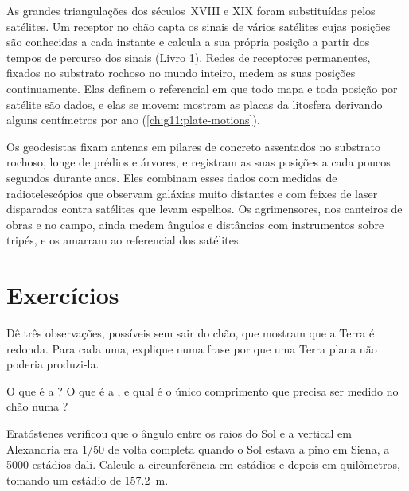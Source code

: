 As grandes triangulações dos séculos~XVIII e XIX foram substituídas pelos
satélites. Um receptor no chão capta os sinais de vários satélites cujas
posições são conhecidas a cada instante e calcula a sua própria posição a
partir dos tempos de percurso dos sinais (Livro 1). Redes de receptores
permanentes, fixados no substrato rochoso no mundo inteiro, medem as suas
posições continuamente. Elas definem o referencial em que todo mapa e toda
posição por satélite são dados, e elas se movem: mostram as placas da
litosfera derivando alguns centímetros por ano
(\cref{ch:g11:plate-motions}).

\begin{inthefield}
Os geodesistas fixam antenas em pilares de concreto assentados no
substrato rochoso, longe de prédios e árvores, e registram as suas
posições a cada poucos segundos durante anos. Eles combinam esses dados
com medidas de radiotelescópios que observam galáxias muito distantes e
com feixes de laser disparados contra satélites que levam espelhos. Os
agrimensores, nos canteiros de obras e no campo, ainda medem ângulos e
distâncias com instrumentos sobre tripés, e os amarram ao referencial dos
satélites.
\end{inthefield}

\section{Exercícios}

\begin{exercise}[$\star$]\label{exo:g10:measuring-the-earth:1}
Dê três observações, possíveis sem sair do chão, que mostram que a Terra é
redonda. Para cada uma, explique numa frase por que uma Terra plana não
poderia produzi-la.
\end{exercise}

\begin{exercise}[$\star$]\label{exo:g10:measuring-the-earth:2}
O que é a ? O que é a , e qual é o único comprimento
que precisa ser medido no chão numa ?
\end{exercise}

\begin{exercise}[$\star$]\label{exo:g10:measuring-the-earth:3}
Eratóstenes verificou que o ângulo entre os raios do Sol e a vertical em
Alexandria era $1/50$ de volta completa quando o Sol estava a pino em
Siena, a 5000 estádios dali. Calcule a circunferência em estádios e depois
em quilômetros, tomando um estádio de \qty{157.2}{m}.
\end{exercise}

